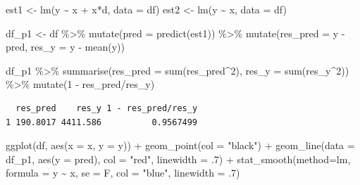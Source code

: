 \documentclass[
  letterpaper,
  DIV=11,
  numbers=noendperiod]{scrreprt}
\newenvironment{Shaded}{\begin{snugshade}}{\end{snugshade}}
\newcommand{\AttributeTok}[1]{\textcolor[rgb]{0.40,0.45,0.13}{#1}}
\newcommand{\DecValTok}[1]{\textcolor[rgb]{0.68,0.00,0.00}{#1}}
\newcommand{\FunctionTok}[1]{\textcolor[rgb]{0.28,0.35,0.67}{#1}}
\newcommand{\NormalTok}[1]{\textcolor[rgb]{0.00,0.23,0.31}{#1}}
\newcommand{\OtherTok}[1]{\textcolor[rgb]{0.00,0.23,0.31}{#1}}
\newcommand{\SpecialCharTok}[1]{\textcolor[rgb]{0.37,0.37,0.37}{#1}}
\newcommand{\StringTok}[1]{\textcolor[rgb]{0.13,0.47,0.30}{#1}}
\begin{document}
\begin{Shaded}
\begin{Highlighting}[]
\NormalTok{est1 }\OtherTok{\textless{}{-}} \FunctionTok{lm}\NormalTok{(y }\SpecialCharTok{\textasciitilde{}}\NormalTok{ x }\SpecialCharTok{+}\NormalTok{ x}\SpecialCharTok{*}\NormalTok{d, }\AttributeTok{data =}\NormalTok{ df)}
\NormalTok{est2 }\OtherTok{\textless{}{-}} \FunctionTok{lm}\NormalTok{(y }\SpecialCharTok{\textasciitilde{}}\NormalTok{ x, }\AttributeTok{data =}\NormalTok{ df)}

\NormalTok{df\_p1 }\OtherTok{\textless{}{-}}\NormalTok{ df }\SpecialCharTok{\%\textgreater{}\%} 
  \FunctionTok{mutate}\NormalTok{(}\AttributeTok{pred =} \FunctionTok{predict}\NormalTok{(est1))  }\SpecialCharTok{\%\textgreater{}\%} 
  \FunctionTok{mutate}\NormalTok{(}\AttributeTok{res\_pred =}\NormalTok{ y }\SpecialCharTok{{-}}\NormalTok{ pred, }
         \AttributeTok{res\_y =}\NormalTok{ y }\SpecialCharTok{{-}} \FunctionTok{mean}\NormalTok{(y))}

\NormalTok{df\_p1 }\SpecialCharTok{\%\textgreater{}\%} 
  \FunctionTok{summarise}\NormalTok{(}\AttributeTok{res\_pred =} \FunctionTok{sum}\NormalTok{(res\_pred}\SpecialCharTok{\^{}}\DecValTok{2}\NormalTok{), }
            \AttributeTok{res\_y =} \FunctionTok{sum}\NormalTok{(res\_y}\SpecialCharTok{\^{}}\DecValTok{2}\NormalTok{)) }\SpecialCharTok{\%\textgreater{}\%} 
  \FunctionTok{mutate}\NormalTok{(}\DecValTok{1} \SpecialCharTok{{-}}\NormalTok{ res\_pred}\SpecialCharTok{/}\NormalTok{res\_y)}
\end{Highlighting}
\end{Shaded}

\begin{verbatim}
  res_pred    res_y 1 - res_pred/res_y
1 190.8017 4411.586          0.9567499
\end{verbatim}

\begin{Shaded}
\begin{Highlighting}[]
\FunctionTok{ggplot}\NormalTok{(df, }\FunctionTok{aes}\NormalTok{(}\AttributeTok{x =}\NormalTok{ x, }\AttributeTok{y =}\NormalTok{ y)) }\SpecialCharTok{+}
  \FunctionTok{geom\_point}\NormalTok{(}\AttributeTok{col =} \StringTok{"black"}\NormalTok{) }\SpecialCharTok{+}
  \FunctionTok{geom\_line}\NormalTok{(}\AttributeTok{data =}\NormalTok{ df\_p1, }\FunctionTok{aes}\NormalTok{(}\AttributeTok{y =}\NormalTok{ pred), }\AttributeTok{col =} \StringTok{"red"}\NormalTok{, }\AttributeTok{linewidth =}\NormalTok{ .}\DecValTok{7}\NormalTok{) }\SpecialCharTok{+}
  \FunctionTok{stat\_smooth}\NormalTok{(}\AttributeTok{method=}\StringTok{\textquotesingle{}lm\textquotesingle{}}\NormalTok{, }\AttributeTok{formula =}\NormalTok{ y }\SpecialCharTok{\textasciitilde{}}\NormalTok{ x, }\AttributeTok{se =}\NormalTok{ F, }\AttributeTok{col =} \StringTok{"blue"}\NormalTok{, }\AttributeTok{linewidth =}\NormalTok{ .}\DecValTok{7}\NormalTok{)}
\end{Highlighting}
\end{Shaded}
\end{document}
